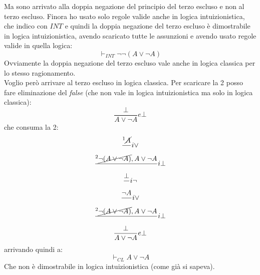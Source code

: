 \documentclass[a4paper,12pt, oneside]{book}
\begin{document}
\begin{esempio}
  Ma sono arrivato alla doppia negazione del principio del terzo escluso e non
  al terzo escluso. Finora ho usato solo regole valide anche in logica
  intuizionistica, che indico con $INT$ e quindi la doppia negazione del terzo
  escluso è dimostrabile 
  in logica intuizionistica, avendo scaricato tutte le assunzioni e avendo usato
  regole valide in quella logica:
  \[\vdash_{INT}\neg \neg(A\lor \neg A)\]
  Ovviamente la doppia negazione del terzo
  escluso vale anche in logica classica per lo stesso ragionamento.\\
  Voglio però arrivare al terzo escluso in logica classica. Per scaricare la 2
  posso fare eliminazione del \textit{false} (che non vale in logica
  intuizionistica ma solo in logica classica):
  \[\frac{\bot}{A\lor \neg A}e\bot\]
  che consuma la 2:
  \begin{gather*}
    \frac{^1\cancel{A}}{}i\lor\\
    \frac{^2\cancel{\neg(A\lor \neg A)}, A\lor \neg A}{}i\bot\\
    \frac{\bot}{}i\neg\\
    \frac{\neg A}{}i\lor\\
    \frac{^2\cancel{\neg(A\lor \neg A)}, A\lor \neg A}{}i\bot\\
    \frac{\bot}{A\lor \neg A}e\bot
  \end{gather*}
  arrivando quindi a:
  \[\vdash_{CL}A\lor \neg A\]
  Che non è dimostrabile in logica intuizionistica (come già si sapeva).
\end{esempio}
\end{document}
